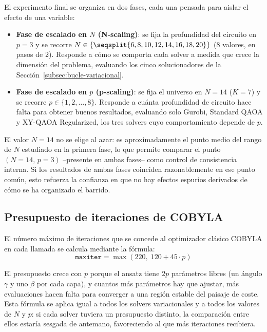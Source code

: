 El experimento final se organiza en dos fases, cada una pensada para aislar el efecto de una variable:

\begin{itemize}
    \item \textbf{Fase de escalado en $N$ (N-scaling)}: se fija la profundidad del circuito en $p=3$ y se recorre $N \in \{\seqsplit{6, 8, 10, 12, 14, 16, 18, 20\}}$ (8 valores, en pasos de 2). Responde a cómo se comporta cada solver a medida que crece la dimensión del problema, evaluando los cinco solucionadores de la Sección~\ref{subsec:bucle-variacional}.
    \item \textbf{Fase de escalado en $p$ (p-scaling)}: se fija el universo en $N=14$ ($K=7$) y se recorre $p \in \{1, 2, \dots, 8\}$. Responde a cuánta profundidad de circuito hace falta para obtener buenos resultados, evaluando solo Gurobi, Standard QAOA y XY-QAOA Regularized, los tres solvers cuyo comportamiento depende de $p$.
\end{itemize}

El valor $N=14$ no se elige al azar: es aproximadamente el punto medio del rango de $N$ estudiado en la primera fase, lo que permite comparar el punto $(N=14,\,p=3)$ --presente en ambas fases-- como control de consistencia interna. Si los resultados de ambas fases coinciden razonablemente en ese punto común, esto refuerza la confianza en que no hay efectos espurios derivados de cómo se ha organizado el barrido.

\subsection{Presupuesto de iteraciones de COBYLA}

El número máximo de iteraciones que se concede al optimizador clásico COBYLA en cada llamada se calcula mediante la fórmula:
\begin{equation}
    \texttt{maxiter} = \max(220,\; 120 + 45 \cdot p)
    \label{eq:maxiter}
\end{equation}

El presupuesto crece con $p$ porque el ansatz tiene $2p$ parámetros libres (un ángulo $\gamma$ y uno $\beta$ por cada capa), y cuantos más parámetros hay que ajustar, más evaluaciones hacen falta para converger a una región estable del paisaje de coste. Esta fórmula se aplica igual a todos los solvers variacionales y a todos los valores de $N$ y $p$: si cada solver tuviera un presupuesto distinto, la comparación entre ellos estaría sesgada de antemano, favoreciendo al que más iteraciones recibiera.

